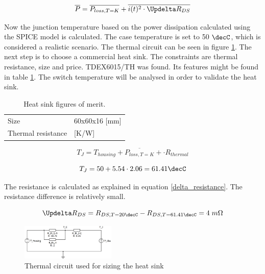 \begin{equation} \label{total_losses}
\overline{P} = \overline{P_{loss, T = K}} + \overline{i(t)^2 \cdot \Updelta R_{DS}}
\end{equation}

Now the junction temperature based on the power dissipation calculated using the SPICE model is calculated. The case temperature is set to 50 $\decC$, which is considered a realistic scenario. The thermal circuit can be seen in figure \ref{thermal_circuit}. The next step is to choose a commercial heat sink. The constraints are thermal resistance, size and price. TDEX6015/TH was found. Its features might be found in table \ref{heatsink_features}. The switch temperature will be analysed in order to validate the heat sink.

\begin{table}[htbp]
	\centering
	\begin{tabular}{|p{6cm}|>{\centering}p{8cm}|}
		\hline
		\rowcolor{lightgray}\multicolumn{2}{|l|}{ \textbf{Features}} \\ \hline
		Size & 60x60x16 [mm]  \tabularnewline \hline
		Thermal resistance & 2 [K/W]  \tabularnewline \hline
		
	\end{tabular}
	\caption{Heat sink figures of merit.}
	\label{heatsink_features}
\end{table}

\begin{equation} \label{switch_temperature}
T_{J} = T_{housing} + \overline{P_{loss, T = K}} + \cdot  R_{thermal}
\end{equation}

\begin{equation} \label{switch_temperature_w_values}
T_{J} = 50 + 5.54 \cdot  2.06 = 61.41 \decC
\end{equation}

The resistance is calculated as explained in equation \ref{delta_resistance}. The resistance difference is relatively small.

\begin{equation} \label{delta_resistance}
\Updelta R_{DS} = R_{DS, T = 20 \decC} - R_{DS, T = 61.41\decC} = 4\; m \Omega
\end{equation}


\begin{figure}[htbp]
	\begin{center}
		\includegraphics[width=0.4\textwidth]{../Pictures/thermal_circuit.png}
		\caption{Thermal circuit used for sizing the heat sink}
		\label{thermal_circuit}
	\end{center}	
\end{figure}



